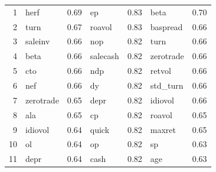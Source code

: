 \begin{footnotesize}
\begin{longtable}{rlc|lc|lc}
		
		1                         & herf                        & 0.69                          & ep                          & 0.83                          & beta                              & 0.70           \\
		2                         & turn                        & 0.67                          & roavol                      & 0.83                          & baspread                          & 0.66           \\
		3                         & saleinv                     & 0.66                          & nop                         & 0.82                          & turn                              & 0.66           \\
		4                         & beta                        & 0.66                          & salecash                    & 0.82                          & zerotrade                         & 0.66           \\
		5                         & cto                         & 0.66                          & ndp                         & 0.82                          & retvol                            & 0.66           \\
		6                         & nef                         & 0.66                          & dy                          & 0.82                          & std\_turn                         & 0.66           \\
		7                         & zerotrade                   & 0.65                          & depr                        & 0.82                          & idiovol                           & 0.66           \\
		8                         & ala                         & 0.65                          & cp                          & 0.82                          & roavol                            & 0.65           \\
		9                         & idiovol                     & 0.64                          & quick                       & 0.82                          & maxret                            & 0.65           \\
		10                        & ol                          & 0.64                          & op                          & 0.82                          & sp                                & 0.63           \\
		11                        & depr                        & 0.64                          & cash                        & 0.82                          & age                               & 0.63           \\

\end{longtable}
\end{footnotesize}
